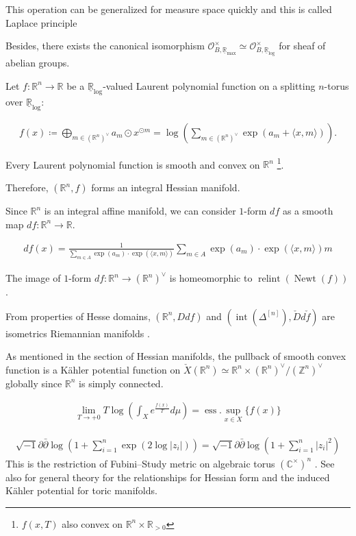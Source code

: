 \documentclass[a4paper,dvipdfmx,reqno,12pt]{amsart}
\theoremstyle{definition}
\newcommand{\deq}{\coloneqq}
\newcommand{\C}{\mathbb{C}}%
\newcommand{\R}{\mathbb{R}}%
\newcommand{\Z}{\mathbb{Z}}%
\newcommand{\mcal}[1]{\mathcal{#1}}%
\newcommand{\opn}[1]{\operatorname{#1}}
\newcommand{\abk}[1]{\langle {#1} \rangle}%
\newcommand{\Paren}[1]{\left ( {#1} \right )}%
\numberwithin{equation}{section}
\begin{document}
This operation can be generalized for measure space quickly and this is called Laplace principle

Besides, there exists the canonical isomorphism
$\mcal{O}_{B,\underline{\R}_{\max}}^{\times}
  \simeq \mcal{O}_{B,\underline{\R}_{\log}}^{\times}$
for sheaf of abelian groups.

Let $f:\R^{n}\to \R$ be a $\underline{\R}_{\opn{log}}$-valued
Laurent polynomial function on a splitting
$n$-torus over $\underline{\R}_{\opn{log}}$:

\newcommand{\biglogplus}{\bigoplus}

\begin{align}
  f(x) \deq \bigoplus_{m \in (\R^{n})^{\vee}} a_m\odot x^{\odot m}
  =\log (\sum_{m \in (\R^{n})^{\vee} }\opn{exp}(a_m+\abk{x,m})).
\end{align}

Every Laurent polynomial function is smooth and convex on $\R^{n}$
\footnote{$f(x,T)$ also convex on $\R^{n}\times \R_{>0}$}.

Therefore, $(\R^{n},f)$ forms an integral Hessian manifold.



Since $\R^{n}$ is an integral affine manifold, we can consider $1$-form $df$ as a smooth map
$df: \R^{n}\to \R$.

\begin{align}
  df(x)= \frac{1}{\sum_{m\in A} \opn{exp}(a_m)\cdot\opn{exp}(\abk{x,m})}
  \sum_{m\in A} \opn{exp}(a_m)\cdot\opn{exp}(\abk{x,m})m
\end{align}

The image of $1$-form $df:\R^{n}\to (\R^{n})^{\vee}$ is
homeomorphic to $\opn{relint}(\opn{Newt}(f))$ \cite[p.124 Exercise]{MR1301331}.

From properties of Hesse domains, $(\R^{n},Ddf)$ and
$(\opn{int}(\Delta^{[n]}),\check{D}d\check{f})$ are isometrics
Riemannian manifolds \cite[Proposition 2.3.3]{}.

As mentioned in the section of Hessian manifolds, the pullback of smooth convex function
is a K\"ahler potential function on $\check{X}(\R^{n})\simeq \R^{n} \times (\R^{n})^{\vee}/(\Z^{n})^{\vee}$
globally since $\R^{n}$ is simply connected.


\begin{align}
  \lim_{T\to +0} T \log \Paren{\int_X e^{\frac{f(x)}{T}}d\mu}=
  \opn{ess}\!.\!\sup_{x\in X}\{f(x)\}
\end{align}

\begin{align}
  \sqrt{-1} \partial \bar{\partial}
  \log(1+\sum_{i=1}^{n}\opn{exp}(2\log |z_i|))
  =\sqrt{-1} \partial \bar{\partial}\log(1+\sum_{i=1}^{n}|z_i|^{2})
\end{align}
This is the restriction of Fubini--Study metric on algebraic torus
$(\C^{\times})^{n}$ \cite[Examples 3.1.9 i)]{MR2093043}.
See also \cite[Appendix 2]{MR1301331} for general theory for
the relationships for Hessian form and the induced K\"{a}hler potential for
toric manifolds.
\end{document}
